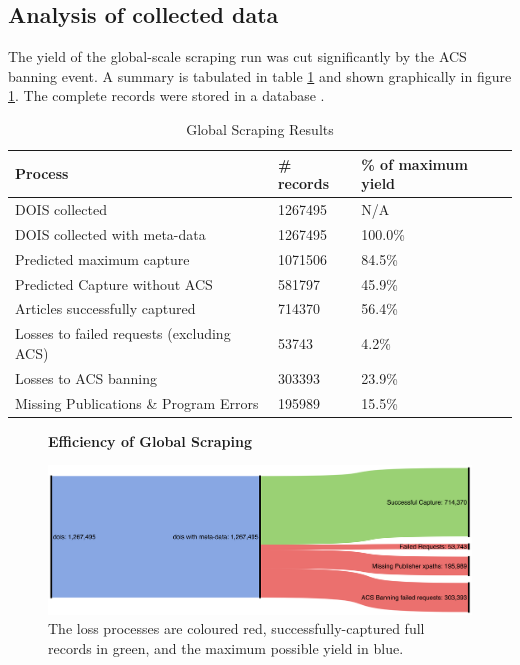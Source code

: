 \subsection{Analysis of collected data}
The yield of the global-scale scraping run was cut significantly by the ACS banning event. A summary is tabulated in table \ref{tab:LARGESCRAPERES} and shown graphically in figure \ref{fig:LARGESANK}. The complete records were stored in a database .
\begin{table}[h!]
\caption{Global Scraping Results}
\label{tab:LARGESCRAPERES}

\begin{center}
\begin{tabular}{||l|l|l||}
\hline
Process & \# records & \% of maximum yield\\
\hline
DOIS collected &  1267495 &N/A\\
DOIS collected with meta-data &  1267495 &100.0\%\\

\hline
Predicted maximum capture & 1071506 &  84.5\%\\
Predicted Capture without ACS & 581797 & 45.9\%\\
\hline
Articles successfully captured & 714370 & 56.4\%\\
Losses to failed requests (excluding ACS)& 53743 & 4.2\%\\
Losses to ACS banning & 303393 & 23.9\%\\
Missing Publications \& Program Errors & 195989 & 15.5\%\\
\hline
\end{tabular}
\end{center}
\end{table}
\begin{figure}[H]
    \centering
    \textbf{Efficiency of Global Scraping}\par\medskip
    \includegraphics[width=\textwidth]{Data_Acquisition/large_sankey.png}
    \caption[Efficiency of Large Scale Scraping]{The loss processes are coloured red, successfully-captured full records in green, and the maximum possible yield in blue.}
     \label{fig:LARGESANK}
\end{figure}

